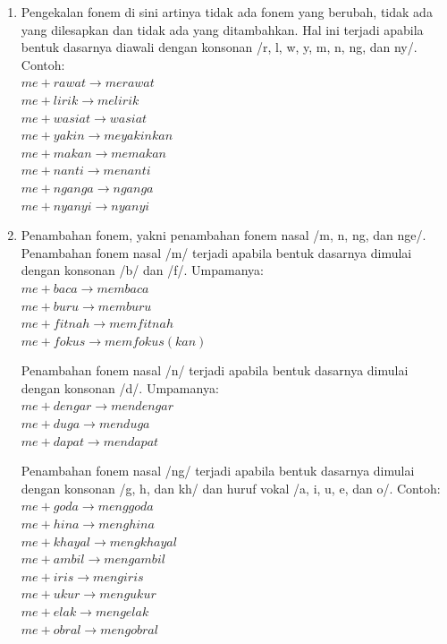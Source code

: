 \begin{enumerate}

	\item Pengekalan fonem di sini artinya tidak ada fonem yang berubah, tidak ada yang dilesapkan dan tidak ada yang ditambahkan. Hal ini terjadi apabila bentuk dasarnya diawali dengan konsonan /r, l, w, y, m, n, ng, dan ny/. Contoh:\\
	$me + rawat \rightarrow merawat$\\
	$me + lirik \rightarrow melirik$\\
	$me + wasiat \rightarrow wasiat$\\
	$me + yakin \rightarrow meyakinkan$\\
	$me + makan \rightarrow memakan$\\
	$me + nanti \rightarrow menanti$\\
	$me + nganga \rightarrow nganga$\\
	$me + nyanyi \rightarrow nyanyi$
	
	\item Penambahan fonem, yakni penambahan fonem nasal /m, n, ng, dan nge/. Penambahan fonem nasal /m/ terjadi apabila bentuk dasarnya dimulai dengan konsonan /b/ dan /f/. Umpamanya:\\
	$me + baca \rightarrow membaca$\\
	$me + buru \rightarrow memburu$\\
	$me + fitnah \rightarrow memfitnah$\\
	$me + fokus \rightarrow memfokus (kan)$
	
	Penambahan fonem nasal /n/ terjadi apabila bentuk dasarnya dimulai dengan konsonan /d/. Umpamanya:\\
	$me + dengar \rightarrow mendengar$\\
	$me + duga \rightarrow menduga$\\
	$me + dapat \rightarrow mendapat$
	
	Penambahan fonem nasal /ng/ terjadi apabila bentuk dasarnya dimulai dengan konsonan /g, h, dan kh/ dan huruf vokal /a, i, u, e, dan o/. Contoh:\\
	$me + goda \rightarrow menggoda$\\
	$me + hina \rightarrow menghina$\\
	$me + khayal \rightarrow mengkhayal$\\
	$me + ambil \rightarrow mengambil$\\
	$me + iris \rightarrow mengiris$\\
	$me + ukur \rightarrow mengukur$\\
	$me + elak \rightarrow mengelak$\\
	$me + obral \rightarrow mengobral$
	

\end{enumerate}
